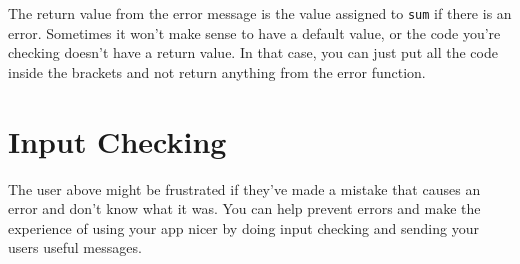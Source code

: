 \documentclass[
]{book}
\newenvironment{Shaded}{\begin{snugshade}}{\end{snugshade}}
\newcommand{\AttributeTok}[1]{\textcolor[rgb]{0.77,0.63,0.00}{#1}}
\newcommand{\CommentTok}[1]{\textcolor[rgb]{0.56,0.35,0.01}{\textit{#1}}}
\newcommand{\ConstantTok}[1]{\textcolor[rgb]{0.00,0.00,0.00}{#1}}
\newcommand{\ControlFlowTok}[1]{\textcolor[rgb]{0.13,0.29,0.53}{\textbf{#1}}}
\newcommand{\FunctionTok}[1]{\textcolor[rgb]{0.00,0.00,0.00}{#1}}
\newcommand{\NormalTok}[1]{#1}
\newcommand{\OtherTok}[1]{\textcolor[rgb]{0.56,0.35,0.01}{#1}}
\newcommand{\SpecialCharTok}[1]{\textcolor[rgb]{0.00,0.00,0.00}{#1}}
\newcommand{\StringTok}[1]{\textcolor[rgb]{0.31,0.60,0.02}{#1}}
\begin{document}
The return value from the error message is the value assigned to \texttt{sum} if there is an error. Sometimes it won't make sense to have a default value, or the code you're checking doesn't have a return value. In that case, you can just put all the code inside the brackets and not return anything from the error function.

\begin{Shaded}
\end{Shaded}

\hypertarget{input-checking}{%
\section{Input Checking}\label{input-checking}}

The user above might be frustrated if they've made a mistake that causes an error and don't know what it was. You can help prevent errors and make the experience of using your app nicer by doing input checking and sending your users useful messages.

\begin{Shaded}
\end{Shaded}
\end{document}
